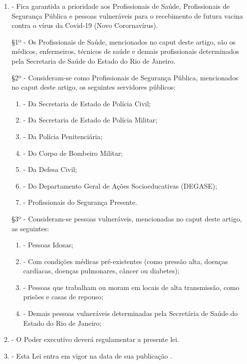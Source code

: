 \documentclass[10pt]{article}
\begin{document}
\begin{enumerate}[label=Art. \arabic*\textdegree]

\item - Fica garantida a prioridade aos Profissionais de Saúde,  Profissionais de Segurança Pública e pessoas vulneráveis para o recebimento de futura vacina contra o vírus da Covid-19 (Novo Corornavírus).

§1º - Os Profissionais de Saúde, mencionados no caput deste artigo, são os médicos, enfermeiros, técnicos de saúde e demais profissionais determinados pela Secretaria de Saúde do Estado do Rio de Janeiro.

§2º - Consideram-se como Profissionais de Segurança Pública, mencionados no caput deste artigo, os seguintes servidores públicos:
\begin{enumerate}[label=\Roman*]
\item - Da Secretaria de Estado de Polícia Civil;
\item - Da Secretaria de Estado de Polícia Militar;
\item - Da Polícia Penitenciária;
\item - Do Corpo de Bombeiro Militar;
\item - Da Defesa Civil;
\item - Do Departamento Geral de Ações Socioeducativas (DEGASE);
\item - Profissionais do Segurança Presente.
\end{enumerate}

§3º - Consideram-se pessoas vulneráveis, mencionadas no caput deste artigo, as seguintes:
\begin{enumerate}[label=\Roman*]
\item - Pessoas Idosas;
\item - Com condições médicas pré-existentes (como pressão alta, doenças cardíacas, doenças pulmonares, câncer ou diabetes);
\item - Pessoas que trabalham ou moram em locais de alta transmissão, como prisões e casas de repouso;
\item - Demais pessoas vulneráveis determinadas pela Secretária de Saúde do Estado do Rio de Janeiro;
\end{enumerate}

\item - O Poder executivo deverá regulamentar a presente lei.

\item - Esta Lei entra em vigor na data de sua publicação .


\end{enumerate}
\end{document}
